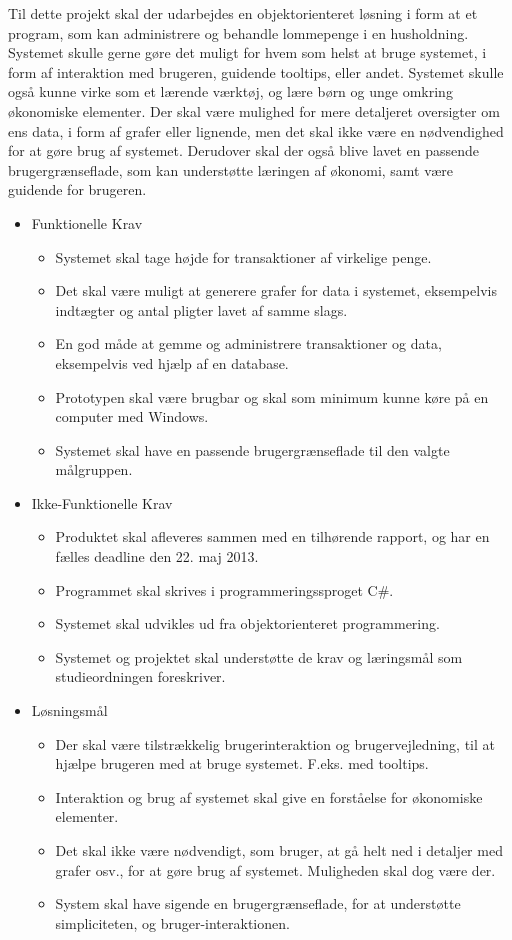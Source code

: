Til dette projekt skal der udarbejdes en objektorienteret løsning i form at et program, som kan administrere og behandle lommepenge i en husholdning. Systemet skulle gerne gøre det muligt for hvem som helst at bruge systemet, i form af interaktion med brugeren, guidende tooltips, eller andet. Systemet skulle også kunne virke som et lærende værktøj, og lære børn og unge omkring økonomiske elementer. Der skal være mulighed for mere detaljeret oversigter om ens data, i form af grafer eller lignende, men det skal ikke være en nødvendighed for at gøre brug af systemet. Derudover skal der også blive lavet en passende brugergrænseflade, som kan understøtte læringen af økonomi, samt være guidende for brugeren.

\begin{itemize}
	\item Funktionelle Krav
	\begin{itemize}
		\item Systemet skal tage højde for transaktioner af virkelige penge.
		\item Det skal være muligt at generere grafer for data i systemet, eksempelvis indtægter og antal pligter lavet af samme slags.
		\item En god måde at gemme og administrere transaktioner og data, eksempelvis ved hjælp af en database.
		\item Prototypen skal være brugbar og skal som minimum kunne køre på en computer med Windows.
		\item Systemet skal have en passende brugergrænseflade til den valgte målgruppen.
	\end{itemize}
	\item Ikke-Funktionelle Krav
	\begin{itemize}
		\item Produktet skal afleveres sammen med en tilhørende rapport, og har en fælles deadline den 22. maj 2013.
		\item Programmet skal skrives i programmeringssproget C\#.
		\item Systemet skal udvikles ud fra objektorienteret programmering.
		\item Systemet og projektet skal understøtte de krav og læringsmål som studieordningen foreskriver.
	\end{itemize}
	\item Løsningsmål
	\begin{itemize}
		\item Der skal være tilstrækkelig brugerinteraktion og brugervejledning, til at hjælpe brugeren med at bruge systemet. F.eks. med tooltips.
		\item Interaktion og brug af systemet skal give en forståelse for økonomiske elementer.
		\item Det skal ikke være nødvendigt, som bruger, at gå helt ned i detaljer med grafer osv., for at gøre brug af systemet. Muligheden skal dog være der.
		\item System skal have sigende en brugergrænseflade, for at understøtte simpliciteten, og bruger-interaktionen.
	\end{itemize}
\end{itemize}
